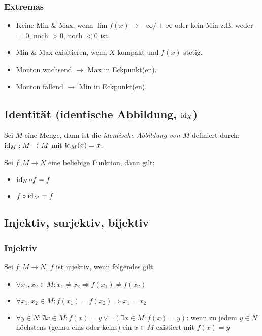 \subsubsection{Extremas}
\begin{itemize}
	\item Keine Min \& Max, wenn $\lim f(x) \rightarrow -\infty / +\infty$ 
		oder kein Min z.B. weder $=0$, noch $>0$, noch $<0$ ist. 
	\item Min \& Max exisitieren, wenn $X$ kompakt und $f(x)$ stetig.
	\item Monton wachsend $\rightarrow$ Max in Eckpunkt(en).
	\item Monton fallend $\rightarrow$ Min in Eckpunkt(en).
\end{itemize}


\subsection{Identität (identische Abbildung, $\operatorname{id}_X$)}\index{$\id$}
Sei $M$ eine Menge, dann ist die \textit{identische Abbildung von $M$} definiert durch:
$\operatorname{id}_M: M \rightarrow M$ mit $\operatorname{id}_M(x) = x$.

Sei $f: M \rightarrow N$ eine beliebige Funktion, dann gilt:
\begin{itemize}
	\item $\operatorname{id}_N \circ f = f$
	\item $f \circ \operatorname{id}_M = f$
\end{itemize}

\subsection{Injektiv, surjektiv, bijektiv}
\subsubsection{Injektiv}
Sei $f: M \rightarrow N$, $f$ ist injektiv, wenn folgendes gilt:
\begin{itemize}
	\item $\forall x_1, x_2 \in M: x_1 \neq x_2 \Rightarrow f(x_1) \neq f(x_2)$
	\item $\forall x_1, x_2 \in M: f(x_1) = f(x_2) \Rightarrow x_1 = x_2$
	\item $\forall y \in N: \nexists x \in M: f(x) = y \lor \lnot(\exists x \in M: f(x) = y)$: wenn zu jedem $y \in N$ höchstens (genau eins oder keins) ein $x \in M$ existiert mit $f(x) = y$
\end{itemize}

